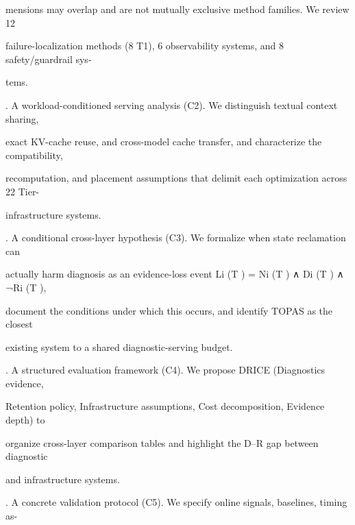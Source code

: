 \begin{flushleft}
\noindent  mensions may overlap and are not mutually exclusive method families. We review 12\par
\noindent  failure-localization methods (8 T1), 6 observability systems, and 8 safety/guardrail sys-\par
\noindent  tems.\par
{}. A workload-conditioned serving analysis (C2). We distinguish textual context sharing,\par
\noindent  exact KV-cache reuse, and cross-model cache transfer, and characterize the compatibility,\par
\noindent  recomputation, and placement assumptions that delimit each optimization across 22 Tier-\par
{} infrastructure systems.\par
{}. A conditional cross-layer hypothesis (C3). We formalize when state reclamation can\par
\noindent  actually harm diagnosis as an evidence-loss event Li (T ) = Ni (T ) ∧ Di (T ) ∧ ¬Ri (T ),\par
\noindent  document the conditions under which this occurs, and identify TOPAS as the closest\par
\noindent  existing system to a shared diagnostic-serving budget.\par
{}. A structured evaluation framework (C4). We propose DRICE (Diagnostics evidence,\par
\noindent  Retention policy, Infrastructure assumptions, Cost decomposition, Evidence depth) to\par
\noindent  organize cross-layer comparison tables and highlight the D–R gap between diagnostic\par
\noindent  and infrastructure systems.\par
{}. A concrete validation protocol (C5). We specify online signals, baselines, timing as-\par
\end{flushleft}
